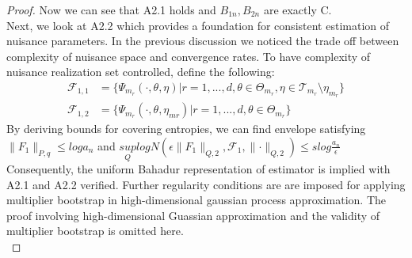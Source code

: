 \documentclass{article}
\begin{document}
\begin{proof}
    Now we can see that A2.1 holds and $B_{1n},B_{2n}$ are exactly C.\\
    Next, we look at A2.2 which provides a foundation for consistent estimation of nuisance parameters. In the previous discussion we noticed the trade off between complexity of nuisance space and convergence rates. To have complexity of nuisance realization set controlled, define the following:
    \begin{align*}
        \mathcal{F}_{1,1} & = \{ \Psi_{m_r} (\cdot,\theta,\eta) | r=1,...,d , \theta \in \Theta_{m_r},\eta \in \mathcal{T}_{m_r} \setminus \eta_{m_r} \}  \\
        \mathcal{F}_{1,2} & =\{ \Psi_{m_r} (\cdot,\theta,\eta_{mr}) | r=1,...,d , \theta \in \Theta_{m_r}\}
    \end{align*}
    By deriving bounds for covering entropies, we can find envelope satisfying $\lVert F_1 \rVert_{P,q} \leq log a_n$ and $\underset{Q}{sup} log N(\epsilon \lVert F_1 \rVert_{Q,2}, \mathcal{F}_{1}, \lVert \cdot \rVert_{Q,2}) \leq slog\frac{a_n}{\epsilon}$
    Consequently, the uniform Bahadur representation of estimator is implied with A2.1 and A2.2 verified. Further regularity conditions are are imposed for applying multiplier bootstrap in high-dimensional gaussian process approximation. The proof involving high-dimensional Guassian approximation and the validity of multiplier bootstrap is omitted here. \\
\end{proof}


{\nocite{*}}
\end{document}
